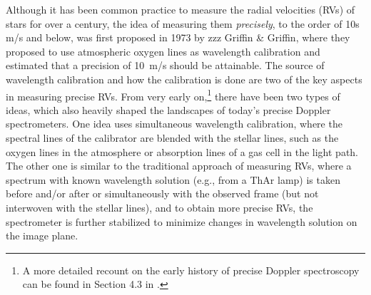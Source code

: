 Although it has been common practice to measure the radial velocities
(RVs) of stars for over a century, the idea of measuring them {\it
precisely}, to the order of 10s m/s and below, was first proposed in
1973 by zzz Griffin \& Griffin, where they proposed to use atmospheric
oxygen lines as wavelength calibration and estimated that a precision
of 10~m/s should be attainable. The source of wavelength calibration
and how the calibration is done are two of the key aspects in
measuring precise RVs. From very early on,\footnote{A more detailed
recount on the early history of precise Doppler spectroscopy can be
found in Section 4.3 in \cite{2013pss3.book..489W}.} there have been
two types of ideas, which also heavily shaped the landscapes of
today's precise Doppler spectrometers. One idea uses simultaneous
wavelength calibration, where the spectral lines of the calibrator are
blended with the stellar lines, such as the oxygen lines in the
atmosphere or absorption lines of a gas cell in the light path. The
other one is similar to the traditional approach of measuring RVs,
where a spectrum with known wavelength solution (e.g., from a ThAr
lamp) is taken before and/or after or simultaneously with the observed
frame (but not interwoven with the stellar lines), and to obtain more
precise RVs, the spectrometer is further stabilized to minimize
changes in wavelength solution on the image plane.


